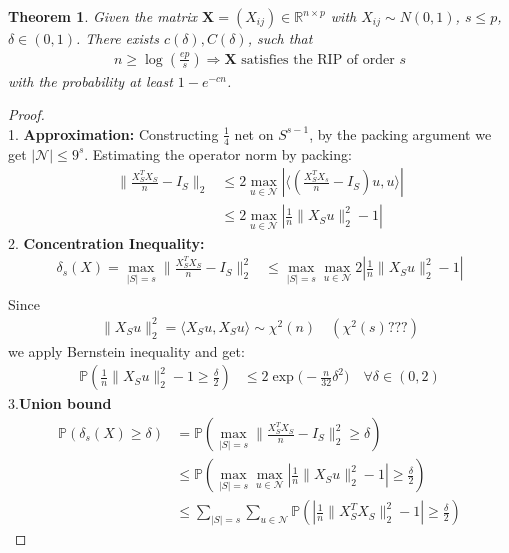 \documentclass[a4paper,12pt, oneside, fleqn]{book}
\newtheorem{theorem}{Theorem}[section]
\theoremstyle{definition}
\theoremstyle{remark}
\begin{document}
\begin{theorem}
	Given the matrix $\mathbf{X} = (X_{ij}) \in \mathbb{R}^{n \times p}$ with $X_{ij} \sim N(0, 1)$, $s \le p$, $\delta \in (0, 1)$. There exists $c(\delta), C(\delta)$, such that\\
	\begin{align*}
		n \ge \log(\frac{ep}{s}) \Rightarrow \text{$\mathbf{X}$ satisfies the RIP of order $s$}
	\end{align*}
	with the probability at least $1 - e^{-cn}$.
\end{theorem}
\begin{proof}\quad \\
	1. \textbf{Approximation:} Constructing $\frac{1}{4}$ net on $S^{s -1}$, by the packing argument we get $|\mathcal{N}| \le 9^s $. Estimating the operator norm by packing:   
	\begin{align*}
		\|\frac{X_S^T X_S}{n} - I_S\|_2 &\le 2 \max_{u \in \mathcal{N}} |\langle (\frac{X_S^T X_s}{n} - I_S)u, u \rangle|\\
		&\le 2\max_{u \in \mathcal{N}} |\frac{1}{n} \|X_Su\|^2_2 - 1|
	\end{align*}
	2. \textbf{Concentration Inequality:}
	\begin{align*}
		\delta_s(X) = \max_{|S| = s}  \|\frac{X^T_S X_S}{n} - I_S\|_2^2
		 &\le \max_{|S| = s} \max_{u \in \mathcal{N}} 2| \frac{1}{n} \|X_Su \|^2_2 - 1|\\
	\end{align*}
	Since
	\begin{align*}
		\|X_S u\|_2^2 = \langle X_S u, X_Su\rangle \sim \chi^2(n)\quad (\chi^2(s)???)
	\end{align*}
	we apply Bernstein inequality and get:
	\begin{align*}
		\mathbb{P}(\frac{1}{n} \|X_Su \|_2^2 - 1 \ge \frac{\delta}{2}) &\le 2\exp\bigg(-\frac{n}{32} \delta^2\bigg) \quad \forall \delta \in (0, 2)
	\end{align*}
	3.\textbf{Union bound}
	\begin{align*}
		\mathbb{P}(\delta_s(X) \ge \delta) &= \mathbb{P}(\max_{|S| = s}  \|\frac{X^T_S X_S}{n} - I_S\|_2^2 \ge \delta)  \\
		&\le \mathbb{P}(\max_{|S| = s} \max_{u \in \mathcal{N}} |\frac{1}{n} \|X_Su \|^2_2 - 1| \ge \frac{\delta}{2})   \\
		&\le \sum_{|S| = s} \sum_{u \in \mathcal{N}}\mathbb{P}(|\frac{1}{n}\|X_S^T X_S\|^2_2 - 1| \geq \frac{\delta}{2})
	\end{align*}
\end{proof}
\end{document}
